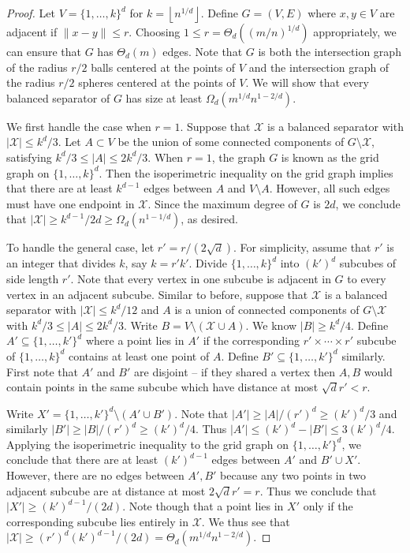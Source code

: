 \documentclass[11pt, reqno]{amsart}
\theoremstyle{plain}
\theoremstyle{definition}
\theoremstyle{remark}
\numberwithin{theorem}{section}
\numberwithin{equation}{section}
\newcommand{\floor}[1]{\left\lfloor #1 \right\rfloor}
\newcommand{\fX}{\mathcal X}
\begin{document}
\begin{proof}
Let $V=\{1,\ldots,k\}^d$ for $k=\floor{n^{1/d}}$. Define $G=(V,E)$ where $x,y\in V$ are adjacent if $\|x-y\|\leq r$. Choosing $1\leq r=\Theta_d((m/n)^{1/d})$ appropriately, we can ensure that $G$ has $\Theta_d(m)$ edges. Note that $G$ is both the intersection graph of the radius $r/2$ balls centered at the points of $V$ and the intersection graph of the radius $r/2$ spheres centered at the points of $V$. We will show that every balanced separator of $G$ has size at least $\Omega_d(m^{1/d}n^{1-2/d})$. 

We first handle the case when $r=1$. Suppose that $\fX$ is a balanced separator with $|\fX|\leq k^d/3$. Let $A\subset V$ be the union of some connected components of $G\setminus\fX$, satisfying $k^d/3\leq|A|\leq 2k^d/3$. When $r=1$, the graph $G$ is known as the grid graph on $\{1,\ldots,k\}^d$. Then the isoperimetric inequality on the grid graph \cite{BL91} implies that there are at least $k^{d-1}$ edges between $A$ and $V\setminus A$. However, all such edges must have one endpoint in $\fX$. Since the maximum degree of $G$ is $2d$, we conclude that $|\fX|\geq k^{d-1}/2d\geq\Omega_d(n^{1-1/d})$, as desired.

To handle the general case, let $r'=r/(2\sqrt{d})$. For simplicity, assume that $r'$ is an integer that divides $k$, say $k=r'k'$. Divide $\{1,\ldots,k\}^d$ into $(k')^d$ subcubes of side length $r'$. Note that every vertex in one subcube is adjacent in $G$ to every vertex in an adjacent subcube. Similar to before, suppose that $\fX$ is a balanced separator with $|\fX|\leq k^d/12$ and $A$ is a union of connected components of $G\setminus \fX$ with $k^d/3\leq |A|\leq 2k^d/3$. Write $B=V\setminus(\fX\cup A)$. We know $|B|\geq k^d/4$. Define $A'\subseteq\{1,\ldots,k'\}^d$ where a point lies in $A'$ if the corresponding $r'\times\cdots\times r'$ subcube of $\{1,\ldots,k\}^d$ contains at least one point of $A$. Define $B'\subseteq\{1,\ldots,k'\}^d$ similarly. First note that $A'$ and $B'$ are disjoint -- if they shared a vertex then $A,B$ would contain points in the same subcube which have distance at most $\sqrt{d}r'<r$.

Write $X'=\{1,\ldots,k'\}^d\setminus(A'\cup B')$. Note that $|A'|\geq|A|/(r')^d\geq (k')^d/3$ and similarly $|B'|\geq|B|/(r')^d\geq (k')^d/4$. Thus $|A'|\leq (k')^d-|B'|\leq 3(k')^d/4$. Applying the isoperimetric inequality to the grid graph on $\{1,\ldots,k'\}^d$, we conclude that there are at least $(k')^{d-1}$ edges between $A'$ and $B'\cup X'$. However, there are no edges between $A',B'$ because any two points in two adjacent subcube are at distance at most $2\sqrt{d}r'=r$. Thus we conclude that $|X'|\geq(k')^{d-1}/(2d)$. Note though that a point lies in $X'$ only if the corresponding subcube lies entirely in $\fX$. We thus see that $|\fX|\geq(r')^d(k')^{d-1}/(2d)=\Theta_d(m^{1/d}n^{1-2/d})$.
\end{proof}
\end{document}
